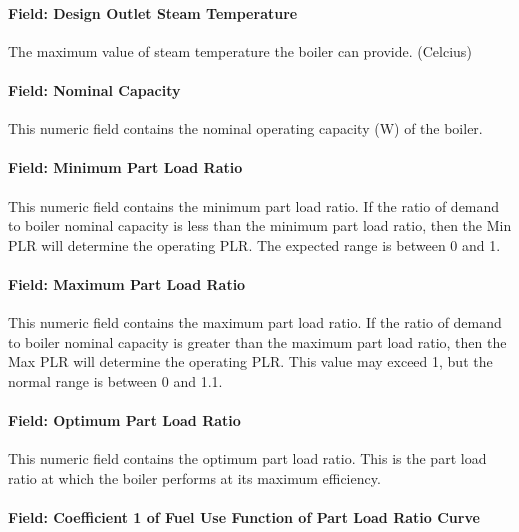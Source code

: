 \paragraph{Field: Design Outlet Steam Temperature}\label{field-design-outlet-steam-temperature}

The maximum value of steam temperature the boiler can provide. (Celcius)

\paragraph{Field: Nominal Capacity}\label{field-nominal-capacity-7}

This numeric field contains the nominal operating capacity (W) of the boiler.

\paragraph{Field: Minimum Part Load Ratio}\label{field-minimum-part-load-ratio-10}

This numeric field contains the minimum part load ratio. If the ratio of demand to boiler nominal capacity is less than the minimum part load ratio, then the Min PLR will determine the operating PLR. The expected range is between 0 and 1.

\paragraph{Field: Maximum Part Load Ratio}\label{field-maximum-part-load-ratio-10}

This numeric field contains the maximum part load ratio. If the ratio of demand to boiler nominal capacity is greater than the maximum part load ratio, then the Max PLR will determine the operating PLR. This value may exceed 1, but the normal range is between 0 and 1.1.

\paragraph{Field: Optimum Part Load Ratio}\label{field-optimum-part-load-ratio-10}

This numeric field contains the optimum part load ratio. This is the part load ratio at which the boiler performs at its maximum efficiency.

\paragraph{Field: Coefficient 1 of Fuel Use Function of Part Load Ratio Curve}\label{field-coefficient-1-of-fuel-use-function-of-part-load-ratio-curve}

